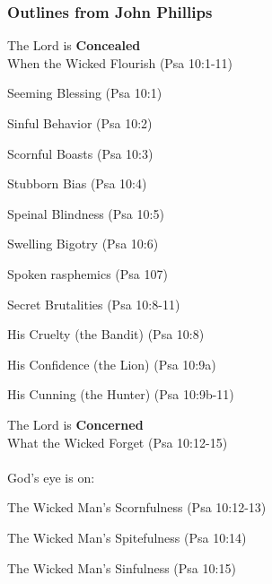 \subsubsection{Outlines from John Phillips}


\begin{compactenum}[I.]
    \item The Lord is \textbf{Concealed} \\
    When the Wicked Flourish  (Psa 10:1-11)
    
    \begin{compactenum}[A.]
    	\item Seeming Blessing   (Psa 10:1)
    	\item Sinful Behavior   (Psa 10:2)
    	\item Scornful Boasts  (Psa 10:3)
    	\item Stubborn Bias  (Psa 10:4)
    	\item Speinal Blindness  (Psa 10:5)
    	\item Swelling Bigotry  (Psa 10:6)
    	\item Spoken rasphemics  (Psa 107)
       	\item Secret Brutalities  (Psa 10:8-11)
       	\begin{compactenum}[1.]
       		\item His Cruelty (the Bandit)  (Psa 10:8)
       		\item His Confidence (the Lion)  (Psa 10:9a)
       		\item His Cunning (the Hunter)  (Psa 10:9b-11)
       	\end{compactenum}
	\end{compactenum}
	
    \item The Lord is \textbf{Concerned} \\
    What the Wicked Forget  (Psa 10:12-15)\\
    \\
    God's eye is on:
    \begin{compactenum}[A.]
    	\item The Wicked Man’s Scornfulness  (Psa 10:12-13)
    	\item The Wicked Man’s Spitefulness  (Psa 10:14)
    	\item The Wicked Man’s Sinfulness  (Psa 10:15)
    \end{compactenum}
    	

\end{compactenum}
